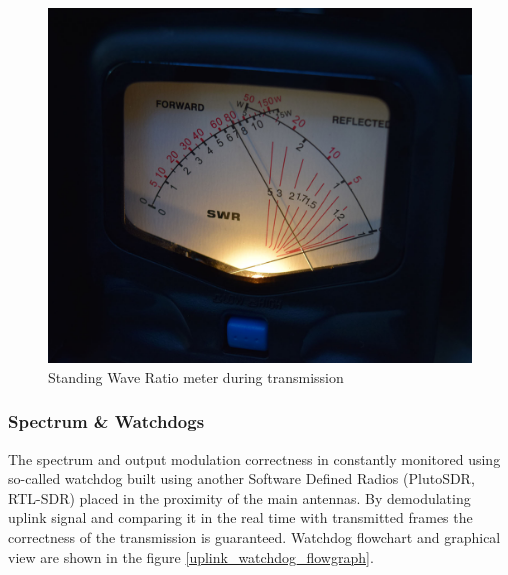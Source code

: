 \begin{figure}
    \centering
    \includegraphics[width=0.6\paperwidth]{img/7/swr_meter_photo.jpg}
    \caption{Standing Wave Ratio meter during transmission}
    \label{swr_meter_photo}
\end{figure}



\subsubsection{Spectrum \& Watchdogs}
The spectrum and output modulation correctness in constantly monitored using so-called watchdog built using another Software Defined Radios (PlutoSDR, RTL-SDR) placed in the proximity of the main antennas.
By demodulating uplink signal and comparing it in the real time with transmitted frames the correctness of the transmission is guaranteed. Watchdog flowchart and graphical view are shown in the figure \ref{uplink_watchdog_flowgraph}.

